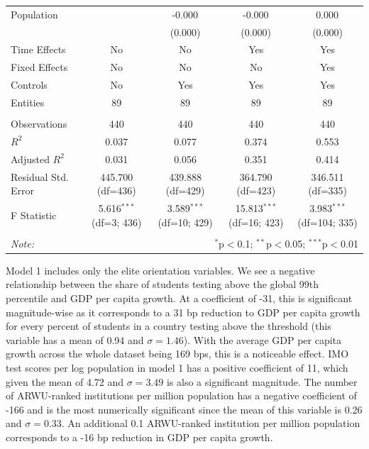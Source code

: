 \documentclass[11pt]{article}
\begin{document}
\begin{table}[H]
{\begin{tabular}{@{\extracolsep{5pt}}lcccc}
            Population & & -0.000$^{}$ & -0.000$^{}$ & 0.000$^{}$ \\
            & & (0.000) & (0.000) & (0.000) \\
            Time Effects & No & No & Yes & Yes \\
            Fixed Effects & No & No & No & Yes \\
            Controls & No & Yes & Yes & Yes \\
            Entities & 89 & 89 & 89 & 89 \\
            \hline \\[-1.8ex]
            Observations & 440 & 440 & 440 & 440 \\
            $R^2$ & 0.037 & 0.077 & 0.374 & 0.553 \\
            Adjusted $R^2$ & 0.031 & 0.056 & 0.351 & 0.414 \\
            Residual Std. Error & 445.700 (df=436) & 439.888 (df=429) & 364.790 (df=423) & 346.511 (df=335) \\
            F Statistic & 5.616$^{***}$ (df=3; 436) & 3.589$^{***}$ (df=10; 429) & 15.813$^{***}$ (df=16; 423) & 3.983$^{***}$ (df=104; 335) \\
            \hline
            \hline \\[-1.8ex]
            \textit{Note:} & \multicolumn{4}{r}{$^{*}$p$<$0.1; $^{**}$p$<$0.05; $^{***}$p$<$0.01} \\
            \end{tabular}
    }
\end{table}

Model 1 includes only the elite orientation variables. We see a negative relationship between the share of students testing above the global 99th percentile and GDP per capita growth. At a coefficient of -31, this is significant magnitude-wise as it corresponds to a 31 bp reduction to GDP per capita growth for every percent of students in a country testing above the threshold (this variable has a mean of 0.94 and $\sigma=1.46$). With the average GDP per capita growth across the whole dataset being 169 bps, this is a noticeable effect. IMO test scores per log population in model 1 has a positive coefficient of 11, which given the mean of 4.72 and $\sigma=3.49$ is also a significant magnitude. The number of ARWU-ranked institutions per million population has a negative coefficient of -166 and is the most numerically significant since the mean of this variable is 0.26 and $\sigma=0.33$. An additional 0.1 ARWU-ranked institution per million population corresponds to a -16 bp reduction in GDP per capita growth.
\end{document}
